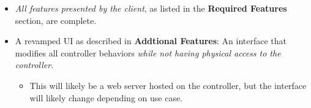 \documentclass[letterpaper,10pt,draftclsnofoot,onecolumn]{article}
\begin{document}
	\begin{itemize}
		\item \textit{All features presented by the client}, as listed in the \textbf{Required Features} section, are complete. 
		\item A revamped UI as described in \textbf{Addtional Features}:  An interface that modifies all controller behaviors \textit{while not having physical access to the controller}.
		\begin{itemize}
			\item This will likely be a web server hosted on the controller, but the interface will likely change depending on use case.  
		\end{itemize}
	\end{itemize}
\end{document}
